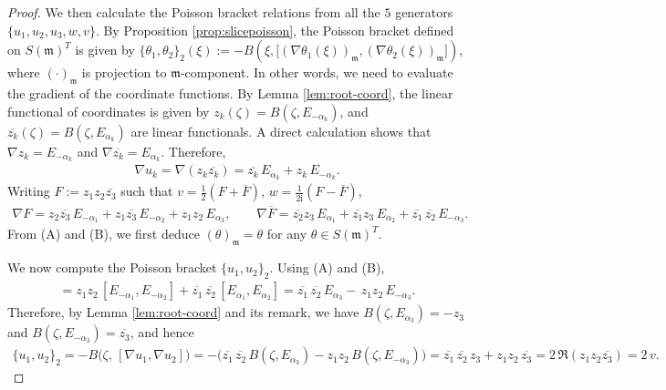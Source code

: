 \documentclass[10pt,a4paper]{amsart}
\begin{document}
\begin{proof}
 
   We then calculate the Poisson bracket relations from all the $5$ generators $\{u_1,u_2,u_3,w,v\}$. By Proposition \ref{prop:slicepoisson}, the Poisson bracket defined on $S(\mathfrak{m})^T$ is given by $\{\theta_1,\theta_2\}_2(\xi) :=-B \left(\xi,\bigl[(\nabla\theta_1(\xi))_{\mathfrak{m}},(\nabla\theta_2(\xi))_{\mathfrak{m}}\bigr]\right)$, where $(\cdot)_\mathfrak{m}$ is projection to $\mathfrak{m}$-component. In other words, we need to evaluate the gradient of the coordinate functions. By Lemma \ref{lem:root-coord}, the linear functional of coordinates is given by $z_k(\zeta)=B(\zeta,E_{-\alpha_k})$, and $\overline{z_k}(\zeta)=B(\zeta,E_{\alpha_k})$ are linear functionals. A direct calculation shows that  $\nabla z_k=E_{-\alpha_k}$ and $\nabla \overline{z_k}=E_{\alpha_k}$. Therefore, \begin{align}
\nabla u_k=\nabla(z_k\overline{z_k})=\overline{z_k}\,E_{\alpha_k}+z_k\,E_{-\alpha_k}.\tag{A}
\end{align} Writing $F:=z_1z_2\overline{z_3}$ such that $v=\frac{1}{2}(F+\overline{F})$, $w=\frac{1}{2\mathrm{i}}(F-\overline{F})$, \begin{align}
\nabla F=z_2\overline{z_3}\,E_{-\alpha_1}+z_1\overline{z_3}\,E_{-\alpha_2}+z_1z_2\,E_{\alpha_3},\qquad \nabla\overline{F}=\overline{z_2}z_3\,E_{\alpha_1}+\overline{z_1}z_3\,E_{\alpha_2}+\overline{z_1}\,\overline{z_2}\,E_{-\alpha_3}.\tag{B}
\end{align} From (A) and (B), we first deduce $(\theta)_\mathfrak{m} =\theta$ for any $\theta \in S(\mathfrak{m})^T$.

We now compute the Poisson bracket $\{u_1,u_2\}_2$.  Using (A) and (B), \begin{align*}
[\nabla u_1,\nabla u_2] = z_1z_2\,[E_{-\alpha_1},E_{-\alpha_2}]+\overline{z_1}\,\overline{z_2}\,[E_{\alpha_1},E_{\alpha_2}] =  \overline{z_1}\,\overline{z_2}\,E_{\alpha_3}-\,z_1z_2\,E_{-\alpha_3}.
\end{align*} Therefore, by Lemma \ref{lem:root-coord} and its remark, we have $B(\zeta,E_{\alpha_3}) = -z_3$ and $B(\zeta,E_{-\alpha_3}) = \overline{z_3}$, and hence \begin{align*}
\{u_1,u_2\}_2 =-B\big(\zeta,\,[\nabla u_1,\nabla u_2]\big) = -\Big( \overline{z_1}\,\overline{z_2}\,B(\zeta,E_{\alpha_3}) -z_1z_2\,B(\zeta,E_{-\alpha_3})\Big) = \overline{z_1}\,\overline{z_2}\,z_3 +z_1z_2\,\overline{z_3} = 2\,\Re(z_1z_2\overline{z_3}) = 2\,v.
\end{align*}


\end{proof}
\end{document}
